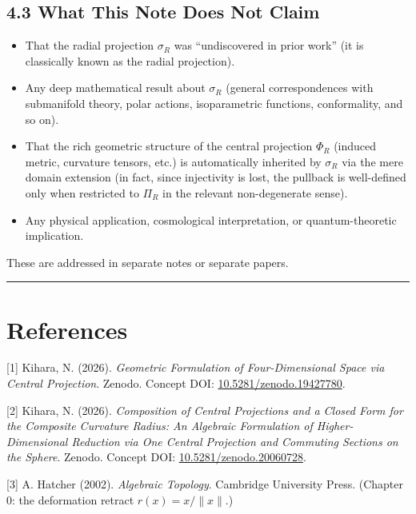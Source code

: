 \documentclass[
]{ltjsarticle}
\providecommand{\tightlist}{%
  \setlength{\itemsep}{0pt}\setlength{\parskip}{0pt}}
\begin{document}
\subsection{4.3 What This Note Does Not
Claim}\label{what-this-note-does-not-claim}

\begin{itemize}
\tightlist
\item
  That the radial projection \(\sigma_R\) was ``undiscovered in prior
  work'' (it is classically known as the radial projection).
\item
  Any deep mathematical result about \(\sigma_R\) (general
  correspondences with submanifold theory, polar actions, isoparametric
  functions, conformality, and so on).
\item
  That the rich geometric structure of the central projection \(\Phi_R\)
  (induced metric, curvature tensors, etc.) is automatically inherited
  by \(\sigma_R\) via the mere domain extension (in fact, since
  injectivity is lost, the pullback is well-defined only when restricted
  to \(\Pi_R\) in the relevant non-degenerate sense).
\item
  Any physical application, cosmological interpretation, or
  quantum-theoretic implication.
\end{itemize}

These are addressed in separate notes or separate papers.

\begin{center}\rule{0.5\linewidth}{0.5pt}\end{center}

\section{References}\label{references}

{[}1{]} Kihara, N. (2026). \emph{Geometric Formulation of
Four-Dimensional Space via Central Projection}. Zenodo. Concept DOI:
\href{https://doi.org/10.5281/zenodo.19427780}{10.5281/zenodo.19427780}.

{[}2{]} Kihara, N. (2026). \emph{Composition of Central Projections and
a Closed Form for the Composite Curvature Radius: An Algebraic
Formulation of Higher-Dimensional Reduction via One Central Projection
and Commuting Sections on the Sphere}. Zenodo. Concept DOI:
\href{https://doi.org/10.5281/zenodo.20060728}{10.5281/zenodo.20060728}.

{[}3{]} A. Hatcher (2002). \emph{Algebraic Topology}. Cambridge
University Press. (Chapter 0: the deformation retract
\(r(x) = x/\|x\|\).)
\end{document}
